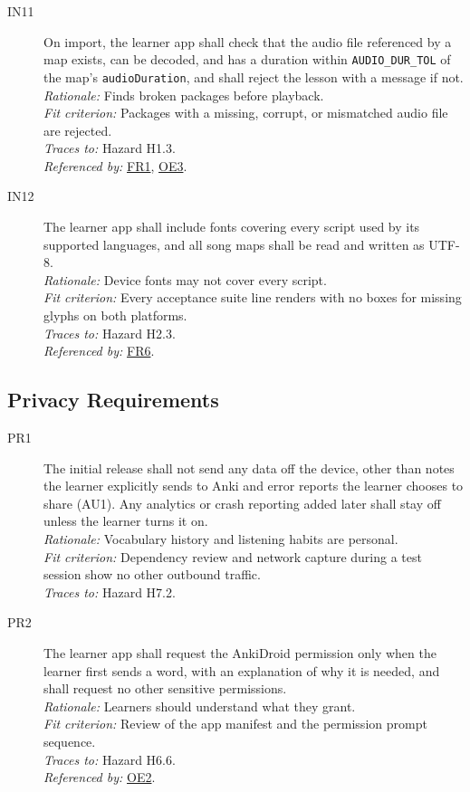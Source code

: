 \documentclass[12pt]{article}
\newcommand{\cn}[1]{\texttt{#1}}
\newcommand{\rat}[1]{\\\textit{Rationale:} #1}
\newcommand{\fit}[1]{\\\textit{Fit criterion:} #1}
\newcommand{\trace}[1]{\\\textit{Traces to:} #1}
\newcommand{\usedby}[1]{\\\textit{Referenced by:} #1}
\newcommand{\reqdef}[1]{\hypertarget{req:#1}{#1}}
\newcommand{\req}[1]{\hyperlink{req:#1}{#1}}
\begin{document}
\begin{description}
\item[\reqdef{IN11}] On import, the learner app shall check that the audio file
referenced by a map exists, can be decoded, and has a duration within
\cn{AUDIO\_DUR\_TOL} of the map's \texttt{audioDuration}, and shall reject the
lesson with a message if not.
\rat{Finds broken packages before playback.}
\fit{Packages with a missing, corrupt, or mismatched audio file are rejected.}
\trace{Hazard H1.3.}
\usedby{\req{FR1}, \req{OE3}.}

\item[\reqdef{IN12}] The learner app shall include fonts covering every script used by
its supported languages, and all song maps shall be read and written as UTF-8.
\rat{Device fonts may not cover every script.}
\fit{Every acceptance suite line renders with no boxes for missing glyphs on both
platforms.}
\trace{Hazard H2.3.}
\usedby{\req{FR6}.}
\end{description}

\subsection{Privacy Requirements}
\begin{description}
\item[\reqdef{PR1}] The initial release shall not send any data off the device, other
than notes the learner explicitly sends to Anki and error reports the learner
chooses to share (AU1). Any analytics or crash reporting added later shall
stay off unless the learner turns it on.
\rat{Vocabulary history and listening habits are personal.}
\fit{Dependency review and network capture during a test session show no other
outbound traffic.}
\trace{Hazard H7.2.}

\item[\reqdef{PR2}] The learner app shall request the AnkiDroid permission only when the
learner first sends a word, with an explanation of why it is needed, and shall
request no other sensitive permissions.
\rat{Learners should understand what they grant.}
\fit{Review of the app manifest and the permission prompt sequence.}
\trace{Hazard H6.6.}
\usedby{\req{OE2}.}
\end{description}
\end{document}
